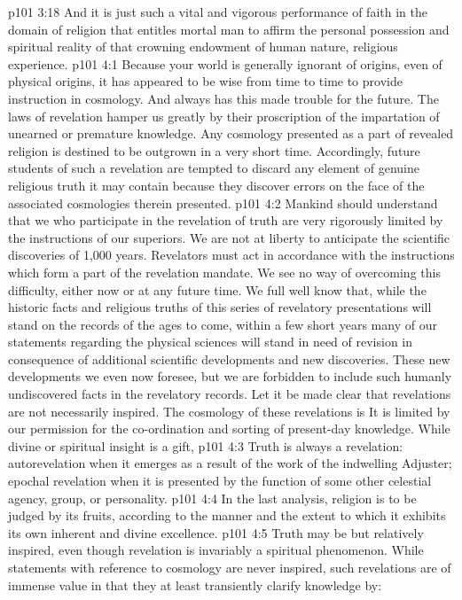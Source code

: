 \vs p101 3:18 And it is just such a vital and vigorous performance of faith in the domain of religion that entitles mortal man to affirm the personal possession and spiritual reality of that crowning endowment of human nature, religious experience.
\vs p101 4:1 Because your world is generally ignorant of origins, even of physical origins, it has appeared to be wise from time to time to provide instruction in cosmology. And always has this made trouble for the future. The laws of revelation hamper us greatly by their proscription of the impartation of unearned or premature knowledge. Any cosmology presented as a part of revealed religion is destined to be outgrown in a very short time. Accordingly, future students of such a revelation are tempted to discard any element of genuine religious truth it may contain because they discover errors on the face of the associated cosmologies therein presented.
\vs p101 4:2 Mankind should understand that we who participate in the revelation of truth are very rigorously limited by the instructions of our superiors. We are not at liberty to anticipate the scientific discoveries of 1,000 years. Revelators must act in accordance with the instructions which form a part of the revelation mandate. We see no way of overcoming this difficulty, either now or at any future time. We full well know that, while the historic facts and religious truths of this series of revelatory presentations will stand on the records of the ages to come, within a few short years many of our statements regarding the physical sciences will stand in need of revision in consequence of additional scientific developments and new discoveries. These new developments we even now foresee, but we are forbidden to include such humanly undiscovered facts in the revelatory records. Let it be made clear that revelations are not necessarily inspired. The cosmology of these revelations is  It is limited by our permission for the co\hyp{}ordination and sorting of present\hyp{}day knowledge. While divine or spiritual insight is a gift, 
\vs p101 4:3 \pc Truth is always a revelation: autorevelation when it emerges as a result of the work of the indwelling Adjuster; epochal revelation when it is presented by the function of some other celestial agency, group, or personality.
\vs p101 4:4 In the last analysis, religion is to be judged by its fruits, according to the manner and the extent to which it exhibits its own inherent and divine excellence.
\vs p101 4:5 \pc Truth may be but relatively inspired, even though revelation is invariably a spiritual phenomenon. While statements with reference to cosmology are never inspired, such revelations are of immense value in that they at least transiently clarify knowledge by:
